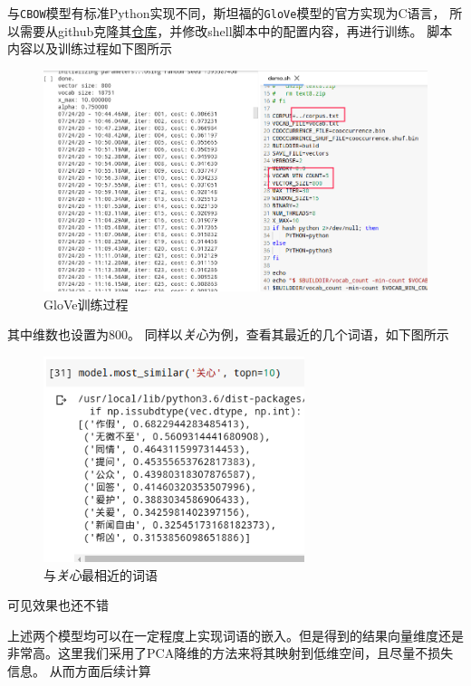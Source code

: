 \documentclass[UTF8]{ctexart}
\begin{document}
\begin{itemize}
    与\lstinline{CBOW}模型有标准Python实现不同，斯坦福的\lstinline{GloVe}模型的官方实现为C语言，
    所以需要从github克隆其\href{https://github.com/stanfordnlp/GloVe}{仓库}，并修改shell脚本中的配置内容，再进行训练。
    脚本内容以及训练过程如下图所示
    \begin{figure}[htb]
        \centering
        \includegraphics[width=6in]{asset/GloVe训练过程.png}
        \caption{GloVe训练过程} %
    \end{figure}

    其中维数也设置为800。
    同样以\textit{关心}为例，查看其最近的几个词语，如下图所示
    \begin{figure}[htb]
        \centering
        \includegraphics[width=3in]{asset/关心glove.png}
        \caption{与\textit{关心}最相近的词语} %
    \end{figure}
    可见效果也还不错

    \newpage
    上述两个模型均可以在一定程度上实现词语的嵌入。但是得到的结果向量维度还是非常高。这里我们采用了PCA降维的方法来将其映射到低维空间，且尽量不损失信息。
    从而方面后续计算
    

\end{itemize}
\end{document}
